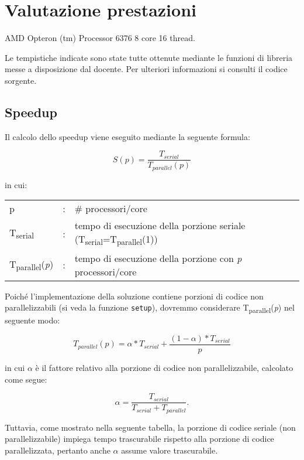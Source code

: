 \section{Valutazione prestazioni}
AMD Opteron (tm) Processor 6376 8 core 16 thread.


Le tempistiche indicate sono state tutte ottenute mediante le funzioni di
libreria messe a disposizione dal docente. Per ulteriori informazioni si
consulti il codice sorgente.

\subsection{Speedup}

Il calcolo dello speedup viene eseguito mediante la seguente formula:

\[ 
    S(p) = \frac{T_{serial}}{T_{parallel}(p)}
\]

in cui:

\begin{center}
\begin{tabular}{lll}
    p & : & \# processori/core\\
    T\textsubscript{serial}& : & tempo di esecuzione della porzione seriale
    (T\textsubscript{serial}=T\textsubscript{parallel}(1))\\
    T\textsubscript{parallel}(\textit{p}) & : & tempo di esecuzione della porzione con
    \textit{p} processori/core
\end{tabular}
\end{center}

Poiché l'implementazione della soluzione contiene porzioni di codice non
parallelizzabili (si veda la funzione \texttt{setup}), dovremmo considerare
T\textsubscript{parallel}(\textit{p}) nel seguente modo:

\[ 
T_{parallel}(p) = \alpha * T_{serial} +  \frac{(1 - \alpha) *
T_{serial}}{p}
\]

in cui $\alpha$ è il fattore relativo alla porzione di codice non
parallelizzabile, calcolato come segue:

\[ 
\alpha = \frac{T_{serial}}{T_{serial} + T_{parallel}}.
\]

Tuttavia, come mostrato nella seguente tabella, la porzione di codice seriale
(non parallelizzabile) impiega tempo trascurabile rispetto alla porzione di
codice parallelizzata, pertanto anche $\alpha$ assume valore trascurabile.


